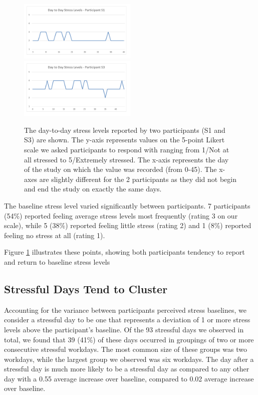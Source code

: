 \begin{figure}
  \centering
      \includegraphics[width=0.5\textwidth]{dailystress_s1.pdf}
      \includegraphics[width=0.5\textwidth]{dailystress_s3.pdf}
  \caption{The day-to-day stress levels reported by two participants (S1 and S3) are shown. The y-axis represents values on the 5-point Likert scale we asked participants to respond with ranging from 1/Not at all stressed to 5/Extremely stressed. The x-axis represents the day of the study on which the value was recorded (from 0-45). The x-axes are slightly different for the 2 participants as they did not begin and end the study on exactly the same days.}
   \vspace*{-2mm}
   \label{fig:dailyStress}
\end{figure}

The baseline stress level varied significantly between participants. 7
participants (54\%) reported feeling average stress levels most frequently
(rating 3 on our scale), while 5 (38\%) reported feeling little stress
(rating 2) and 1 (8\%) reported feeling no stress at all (rating 1).

Figure \ref{fig:dailyStress} illustrates these points, showing both participants tendency to report and return to baseline stress levels

\subsection{Stressful Days Tend to Cluster}
Accounting for the variance between participants perceived stress
baselines, we consider a stressful day to be one that represents a
deviation of 1 or more stress levels above the participant's
baseline. Of the 93 stressful days we observed in total, we found that
39 (41\%) of these days occurred in groupings of two or more
consecutive stressful workdays. The most common size of these groups
was two workdays, while the largest group we observed was six
workdays.  The day after a stressful day is much more likely to be a
stressful day as compared to any other day with a 0.55 average increase
over baseline, compared to 0.02 average increase over baseline.

